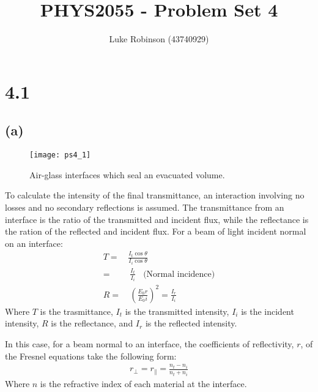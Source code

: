 \documentclass[8pt,a4paper,oneside]{article}
\title{PHYS2055 - Problem Set 4}
\author{Luke Robinson (43740929)}
\begin{document}
\maketitle
\section*{4.1}
\subsection*{(a)}
\begin{figure}[h!]
\begin{center}
\texttt{[image: ps4\_1]}
\caption{Air-glass interfaces which seal an evacuated volume.}
\label{default}
\end{center}
\end{figure}

To calculate the intensity of the final transmittance, an interaction involving no losses and no secondary reflections is assumed. The transmittance from an interface is the ratio of the transmitted and incident flux, while the reflectance is the ration of the reflected and incident flux. For a beam of light incident normal on an interface:
\begin{align}
	T =& \frac{I_t \cos{\theta}}{I_i \cos{\theta}}\\
	=&~ \frac{I_t}{I_i} ~~~~\text{(Normal incidence)}\\
	R =&~ \left(\frac{E_0r}{E_0i}\right)^2 = \frac{I_r}{I_i}
\end{align}
Where $T$ is the trasmittance, $I_t$ is the transmitted intensity, $I_i$ is the incident intensity, $R$ is the reflectance, and $I_r$ is the reflected intensity. 

In this case, for a beam normal to an interface, the coefficients of reflectivity, $r$, of the Fresnel equations take the following form:
\begin{align}
	r_\perp = r_\parallel = \frac{n_t - n_i}{n_t + n_i} 		
\end{align}
Where $n$ is the refractive index of each material at the interface. 
\end{document}
